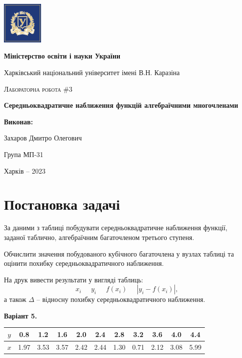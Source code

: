 \documentclass[12pt]{extarticle}
\begin{document}
\begin{titlepage}
	\centering
	\includegraphics[width=0.15\textwidth]{images/lab_1/logo.png}\par\vspace{0.3cm}
	{\textbf{Міністерство освіти і науки України}\par
 Харківський національний університет імені В.Н. Каразіна\par}
    \vspace{1cm}
	{\Large \textsc{Лабораторна робота \#3}\par
    \textbf{Середньоквадратичне наближення функцій алгебраїчними многочленами}\par}
	\vfill
 \begin{FlushRight}
	\textbf{Виконав:}\par Захаров Дмитро Олегович \par Група МП-31
\end{FlushRight}
	\vfill

	{\large Харків -- 2023\par}
\end{titlepage}

\tableofcontents
\pagebreak

\section{Постановка задачі}

За даними з таблиці побудувати середньоквадратичне наближення функції, заданої таблично, алгебраїчним багаточленом третього ступеня.

Обчислити значення побудованого кубічного багаточлена у вузлах таблиці та оцінити похибку середньоквадратичного наближення.

На друк вивести результати у вигляді таблиць:
\[
x_i \; \; \; \; \; y_i \; \; \; \; \; f(x_i) \; \; \; \; \; |y_i-f(x_i)|,
\]
а також $\Delta$ -- відносну похибку середньоквадратичного наближення.

\textbf{Варіант 5.} 
\begin{center}
\begin{tabular}{ |c|c|c|c|c|c|c|c|c|c|c| } 
 \hline
 $y$ & 0.8 & 1.2 & 1.6 & 2.0 & 2.4 & 2.8 & 3.2 & 3.6 & 4.0 & 4.4 \\ \hline 
 $x$ & 1.97 & 3.53 & 3.57 & 2.42 & 2.44 & 1.30 & 0.71 & 2.12 & 3.08 & 5.99 \\ 
 \hline
\end{tabular}
\end{center}
\end{document}
